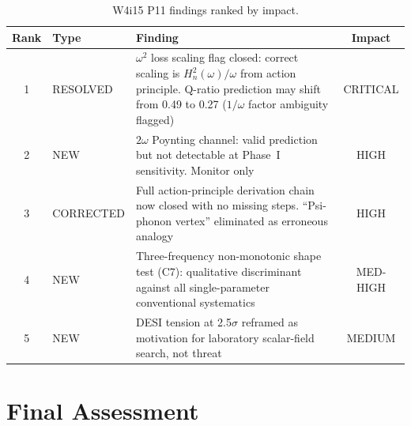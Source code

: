 \documentclass[11pt]{article}
\newcommand{\Heff}{H_n}
\theoremstyle{definition}
\theoremstyle{remark}
\begin{document}
\begin{table}[H]
\centering
\caption{W4i15 P11 findings ranked by impact.}
\label{tab:findings_summary}
\renewcommand{\arraystretch}{1.3}
\begin{tabular}{@{}clp{7cm}c@{}}
\toprule
\textbf{Rank} & \textbf{Type} & \textbf{Finding} & \textbf{Impact} \\
\midrule
1 & RESOLVED & $\omega^2$ loss scaling flag closed: correct scaling
  is $\Heff^2(\omega)/\omega$ from action principle. Q-ratio
  prediction may shift from 0.49 to 0.27 ($1/\omega$ factor
  ambiguity flagged) & CRITICAL \\
2 & NEW & $2\omega$ Poynting channel: valid prediction but not
  detectable at Phase~I sensitivity. Monitor only & HIGH \\
3 & CORRECTED & Full action-principle derivation chain now closed
  with no missing steps. ``Psi-phonon vertex'' eliminated as
  erroneous analogy & HIGH \\
4 & NEW & Three-frequency non-monotonic shape test (C7): qualitative
  discriminant against all single-parameter conventional systematics
  & MED-HIGH \\
5 & NEW & DESI tension at 2.5$\sigma$ reframed as motivation for
  laboratory scalar-field search, not threat & MEDIUM \\
\bottomrule
\end{tabular}
\end{table}


\section{Final Assessment}
\end{document}
